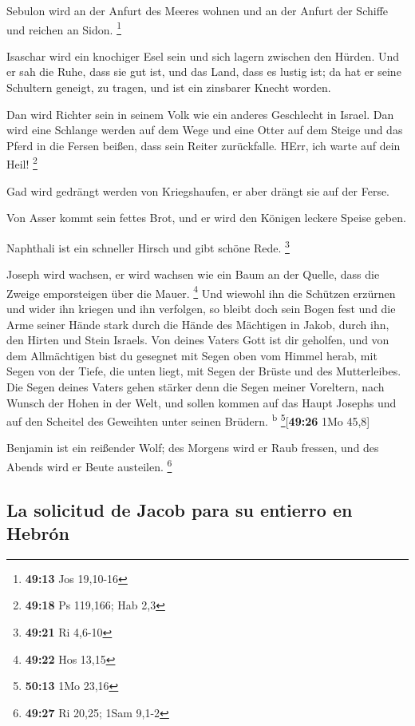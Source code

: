 Sebulon wird an der Anfurt des Meeres wohnen und an der
Anfurt der Schiffe und reichen an Sidon. \footnote{\textbf{49:13} Jos
  19,10-16}

 Isaschar wird ein knochiger Esel sein und sich lagern
zwischen den Hürden.  Und er sah die Ruhe, dass sie gut
ist, und das Land, dass es lustig ist; da hat er seine Schultern
geneigt, zu tragen, und ist ein zinsbarer Knecht worden.

 Dan wird Richter sein in seinem Volk wie ein anderes
Geschlecht in Israel.  Dan wird eine Schlange werden auf
dem Wege und eine Otter auf dem Steige und das Pferd in die Fersen
beißen, dass sein Reiter zurückfalle.  HErr, ich warte
auf dein Heil! \footnote{\textbf{49:18} Ps 119,166; Hab 2,3}

 Gad wird gedrängt werden von Kriegshaufen, er aber
drängt sie auf der Ferse.

 Von Asser kommt sein fettes Brot, und er wird den
Königen leckere Speise geben.

 Naphthali ist ein schneller Hirsch und gibt schöne Rede.
\footnote{\textbf{49:21} Ri 4,6-10}

 Joseph wird wachsen, er wird wachsen wie ein Baum an der
Quelle, dass die Zweige emporsteigen über die Mauer. \footnote{\textbf{49:22}
  Hos 13,15}  Und wiewohl ihn die Schützen erzürnen und
wider ihn kriegen und ihn verfolgen,  so bleibt doch sein
Bogen fest und die Arme seiner Hände stark durch die Hände des Mächtigen
in Jakob, durch ihn, den Hirten und Stein Israels.  Von
deines Vaters Gott ist dir geholfen, und von dem Allmächtigen bist du
gesegnet mit Segen oben vom Himmel herab, mit Segen von der Tiefe, die
unten liegt, mit Segen der Brüste und des Mutterleibes. 
Die Segen deines Vaters gehen stärker denn die Segen meiner Voreltern,
nach Wunsch der Hohen in der Welt, und sollen kommen auf das Haupt
Josephs und auf den Scheitel des Geweihten unter seinen Brüdern.
\textsuperscript{b} \footnote{\textbf{50:13} 1Mo 23,16}{[}\textbf{49:26}
1Mo 45,8{]}

 Benjamin ist ein reißender Wolf; des Morgens wird er
Raub fressen, und des Abends wird er Beute austeilen. \footnote{\textbf{49:27}
  Ri 20,25; 1Sam 9,1-2}

\hypertarget{la-solicitud-de-jacob-para-su-entierro-en-hebruxf3n}{%
\subsection{La solicitud de Jacob para su entierro en
Hebrón}\label{la-solicitud-de-jacob-para-su-entierro-en-hebruxf3n}}

